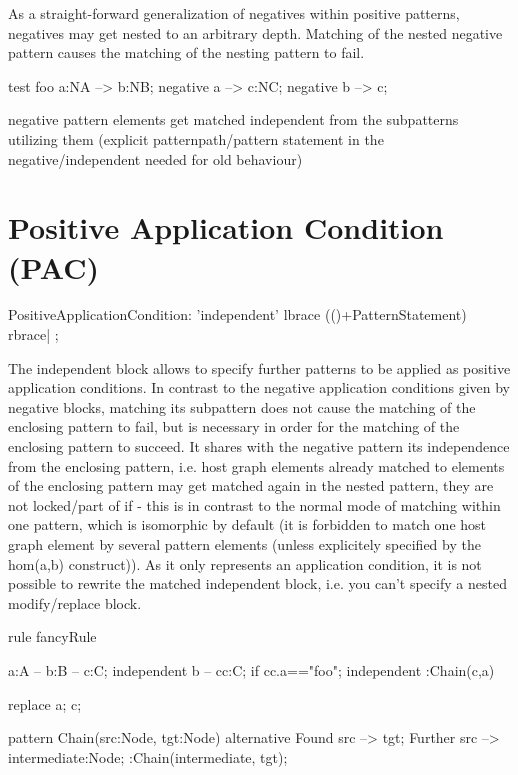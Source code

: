 As a straight-forward generalization of negatives within positive patterns,
negatives may get nested to an arbitrary depth. Matching of the nested
negative pattern causes the matching of the nesting pattern to fail.

\begin{example}
  \begin{grgen}
test foo {
  a:NA --> b:NB;
  negative {
    a --> c:NC;
    negative {
      b --> c;
    }
  }
}
  \end{grgen}
\end{example}

   negative pattern elements get matched independent from the subpatterns utilizing them
	(explicit patternpath/pattern statement in the negative/independent needed for old behaviour)

	
\section{Positive Application Condition (PAC)}
 \label{pac}

\begin{rail}  
  PositiveApplicationCondition: 
    'independent' lbrace (()+PatternStatement) rbrace|
    ;
\end{rail}
  
The independent block allows to specify further patterns 
to be applied as positive application conditions.
In contrast to the negative application conditions given by negative blocks,
matching its subpattern does not cause the matching of the enclosing pattern 
to fail, but is necessary in order for the matching of the enclosing pattern
to succeed. It shares with the negative pattern its independence from the 
enclosing pattern, i.e. host graph elements already matched to elements of the
enclosing pattern may get matched again in the nested pattern, they are not
locked/part of if - this is in contrast to the normal mode of matching within
one pattern, which is isomorphic by default (it is forbidden to match one 
host graph element by several pattern elements (unless explicitely specified 
by the hom(a,b) construct)). As it only represents an application condition,
it is not possible to rewrite the matched independent block,
i.e. you can't specify a nested modify/replace block.

\begin{example}
  \begin{grgen}

rule fancyRule
{
  a:A -- b:B -- c:C;
  independent {
    b -- cc:C;
	if { cc.a=="foo"; }
  }
  independent {
    :Chain(c,a)
  }
  
  replace {
    a; c;
  }
}

pattern Chain(src:Node, tgt:Node)
{
  alternative {
    Found {
	  src --> tgt;
    }
    Further {
      src --> intermediate:Node;
      :Chain(intermediate, tgt);
    }
  }
}
  \end{grgen}
\end{example}


